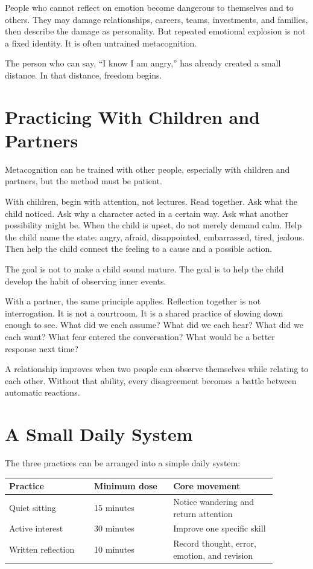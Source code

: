 People who cannot reflect on emotion become dangerous to themselves and to others. They may damage relationships, careers, teams, investments, and families, then describe the damage as personality. But repeated emotional explosion is not a fixed identity. It is often untrained metacognition.

The person who can say, ``I know I am angry,'' has already created a small distance. In that distance, freedom begins.

\section*{Practicing With Children and Partners}

Metacognition can be trained with other people, especially with children and partners, but the method must be patient.

With children, begin with attention, not lectures. Read together. Ask what the child noticed. Ask why a character acted in a certain way. Ask what another possibility might be. When the child is upset, do not merely demand calm. Help the child name the state: angry, afraid, disappointed, embarrassed, tired, jealous. Then help the child connect the feeling to a cause and a possible action.

The goal is not to make a child sound mature. The goal is to help the child develop the habit of observing inner events.

With a partner, the same principle applies. Reflection together is not interrogation. It is not a courtroom. It is a shared practice of slowing down enough to see. What did we each assume? What did we each hear? What did we each want? What fear entered the conversation? What would be a better response next time?

A relationship improves when two people can observe themselves while relating to each other. Without that ability, every disagreement becomes a battle between automatic reactions.

\section*{A Small Daily System}

The three practices can be arranged into a simple daily system:

\begin{center}
\begin{tabular}{p{0.28\linewidth}p{0.26\linewidth}p{0.34\linewidth}}
\hline
Practice & Minimum dose & Core movement \\
\hline
Quiet sitting & 15 minutes & Notice wandering and return attention \\
Active interest & 30 minutes & Improve one specific skill \\
Written reflection & 10 minutes & Record thought, error, emotion, and revision \\
\hline
\end{tabular}
\end{center}


